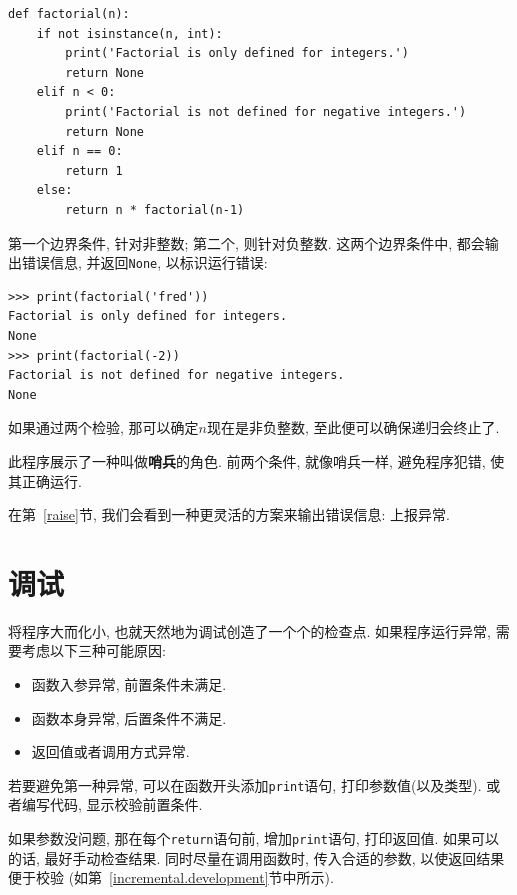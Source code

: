\documentclass[10pt]{book}
\begin{document}
\begin{verbatim}
def factorial(n):
    if not isinstance(n, int):
        print('Factorial is only defined for integers.')
        return None
    elif n < 0:
        print('Factorial is not defined for negative integers.')
        return None
    elif n == 0:
        return 1
    else:
        return n * factorial(n-1)
\end{verbatim}
%
第一个边界条件, 针对非整数;
第二个, 则针对负整数. 
这两个边界条件中, 都会输出错误信息, 并返回{\tt None}, 
以标识运行错误:

\begin{verbatim}
>>> print(factorial('fred'))
Factorial is only defined for integers.
None
>>> print(factorial(-2))
Factorial is not defined for negative integers.
None
\end{verbatim}
% 
如果通过两个检验, 那可以确定$n$现在是非负整数, 
至此便可以确保递归会终止了. 

此程序展示了一种叫做{\bf 哨兵}的角色. 
前两个条件, 就像哨兵一样, 避免程序犯错, 使其正确运行. 

在第~\ref{raise}节, 我们会看到一种更灵活的方案来输出错误信息: 上报异常. 


\section{调试}
\label{factdebug}
将程序大而化小, 也就天然地为调试创造了一个个的检查点. 
如果程序运行异常, 需要考虑以下三种可能原因:

\begin{itemize}

\item 函数入参异常, 前置条件未满足. 

\item 函数本身异常, 后置条件不满足. 

\item 返回值或者调用方式异常. 

\end{itemize}

若要避免第一种异常, 可以在函数开头添加{\tt print}语句, 打印参数值(以及类型). 
或者编写代码, 显示校验前置条件. 

如果参数没问题, 那在每个{\tt return}语句前, 增加{\tt print}语句, 打印返回值. 
如果可以的话, 最好手动检查结果. 同时尽量在调用函数时, 传入合适的参数, 
以使返回结果便于校验
(如第~\ref{incremental.development}节中所示). 
\end{document}
